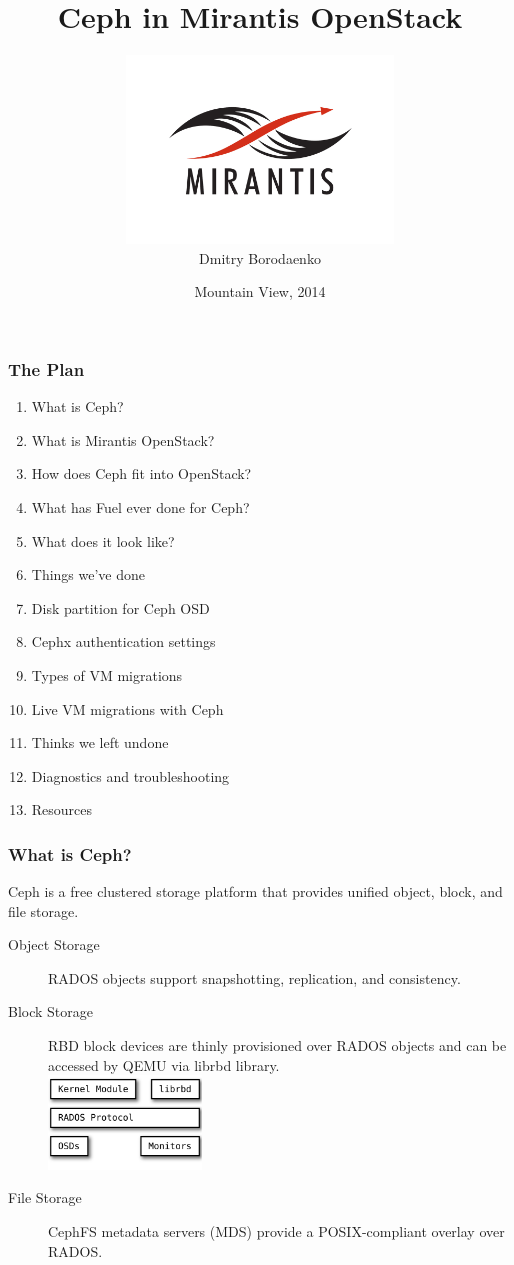 \documentclass[hyperref=unicode,utf8,xcolor=pst]{beamer}
\title{\fontsize{26}{0}\selectfont Ceph in Mirantis OpenStack}
\author{\vspace{-2.5mm}\includegraphics[height=5cm]{Vector_RGB_MirantisLogo}\\Dmitry Borodaenko}
\date{Mountain View, 2014}
\begin{document}
\begin{frame}
	\titlepage
\end{frame}

\begin{frame}
	\frametitle{The Plan}
	\begin{enumerate}
		\item What is Ceph?
		\item What is Mirantis OpenStack?
		\item How does Ceph fit into OpenStack?
		\item What has Fuel ever done for Ceph?
		\item What does it look like?
		\item Things we've done
		\item Disk partition for Ceph OSD
		\item Cephx authentication settings
		\item Types of VM migrations
		\item Live VM migrations with Ceph
		\item Thinks we left undone
		\item Diagnostics and troubleshooting
		\item Resources
	\end{enumerate}
\end{frame}

\begin{frame}
	\frametitle{What is Ceph?}
	Ceph is a free clustered storage platform that provides unified
	object, block, and file storage.

	\begin{description}
		\item[Object Storage] RADOS objects support
			snapshotting, replication, and consistency.
		\item[Block Storage] RBD block devices are thinly
			provisioned over RADOS objects and can be
			accessed by QEMU via librbd library.\\
			\includegraphics[height=2.5cm]{ceph-rbd}
		\item[File Storage] CephFS metadata servers (MDS)
			provide a POSIX-compliant overlay over RADOS.
	\end{description}
\end{frame}
\end{document}
